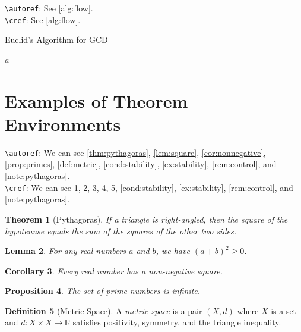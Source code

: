 \documentclass[onecolumn]{article}
\newtheorem{theorem}{Theorem}[section]
\newtheorem{lemma}[theorem]{Lemma}
\newtheorem{corollary}[theorem]{Corollary}
\newtheorem{proposition}[theorem]{Proposition}
\theoremstyle{definition}
\newtheorem{definition}[theorem]{Definition}
\theoremstyle{remark}
\begin{document}
\verb+\autoref+: See \autoref{alg:flow}. \\
\verb+\cref+: See \cref{alg:flow}.

\begin{algorithm}[h]
\caption{Euclid’s Algorithm for GCD}   %

\Return $a$\;                          %
\label{alg:flow}
\end{algorithm}

\section{Examples of Theorem Environments}

\verb+\autoref+: We can see \autoref{thm:pythagoras}, \autoref{lem:square}, \autoref{cor:nonnegative}, 
\autoref{prop:primes}, \autoref{def:metric}, \autoref{cond:stability}, 
\autoref{ex:stability}, \autoref{rem:control}, and \autoref{note:pythagoras}. \\
\verb+\cref+: We can see \cref{thm:pythagoras}, \cref{lem:square}, \cref{cor:nonnegative}, 
\cref{prop:primes}, \cref{def:metric}, \cref{cond:stability}, 
\cref{ex:stability}, \cref{rem:control}, and \cref{note:pythagoras}.

\begin{theorem}[Pythagoras] %
\label{thm:pythagoras}
If a triangle is right-angled, then the square of the hypotenuse equals the sum of the squares of the other two sides.
\end{theorem}

\begin{lemma} %
\label{lem:square}
For any real numbers $a$ and $b$, we have $(a+b)^2 \geq 0$.
\end{lemma}

\begin{corollary} %
\label{cor:nonnegative}
Every real number has a non-negative square.
\end{corollary}

\begin{proposition} %
\label{prop:primes}
The set of prime numbers is infinite.
\end{proposition}

\begin{definition}[Metric Space] %
\label{def:metric}
A \emph{metric space} is a pair $(X,d)$ where $X$ is a set and $d:X\times X\to\mathbb{R}$ satisfies positivity, symmetry, and the triangle inequality.
\end{definition}
\end{document}
